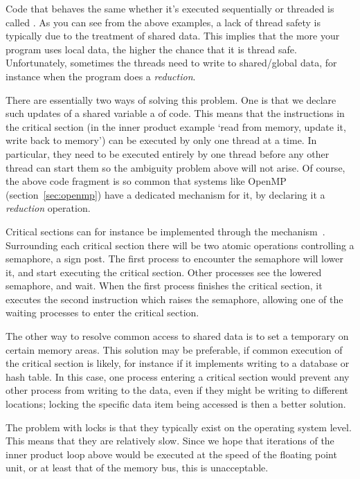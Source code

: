 Code that behaves the same whether it's executed
sequentially or threaded is called .
As you can see from the above examples, a lack of thread safety is
typically due to the treatment of shared data. This implies that
the more your program uses local data, the higher the chance
that it is thread safe. Unfortunately, sometimes the threads need
to write to shared/global data, for instance when the program
does a \emph{reduction}.

There are essentially two ways of solving this problem. 
One is that we declare such updates of a shared variable a
 of code. This means that the instructions
in the critical section (in the inner product example `read 
from memory, update it, write back to memory') can be executed by only
one thread at a time. In particular, they need to be executed
entirely by one thread before any other thread can start them so the
ambiguity problem above will not arise. Of course, the above code
fragment is so common that systems like OpenMP
(section~\ref{sec:openmp}) have a dedicated mechanism for it, by
declaring it a \emph{reduction}
operation.

Critical sections can for instance be implemented through the 
mechanism~\cite{Dijkstra:semaphores}. Surrounding each critical
section there will be two atomic operations controlling a semaphore, a
sign post.
The first process to encounter the semaphore will lower it, and start
executing the critical section. Other processes see the lowered
semaphore, and wait. When the first process finishes the critical
section, it executes the second instruction which raises the
semaphore, allowing one of the waiting processes to enter the critical
section.

The other way to resolve common access to shared data is to set a 
temporary  on certain memory areas. This solution may
be preferable, if common execution of the critical section is likely,
for instance if it implements writing to a database or hash table. In
this case, one process entering a
critical section would prevent any other process from writing
to the data, even if they might be writing to different locations;
locking the specific data item being accessed is then a better
solution.

The problem with locks is that they typically exist on the operating
system level. This means that they are relatively slow. Since we hope that
iterations of the inner product loop above would be executed at the
speed of the floating point unit, or at least that of the memory bus,
this is unacceptable.

